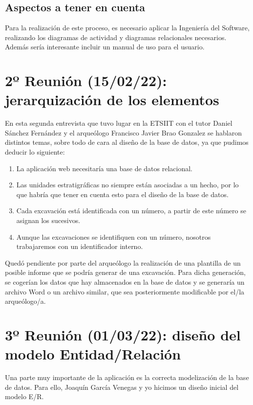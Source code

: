     \subsection{Aspectos a tener en cuenta}
    Para la realización de este proceso, es necesario aplicar la Ingeniería del Software,
    realizando los diagramas de actividad y diagramas relacionales necesarios.
    Además sería interesante incluir un manual de uso para el usuario.

\section{2º Reunión (15/02/22): jerarquización de los elementos}
En esta segunda entrevista que tuvo lugar en la ETSIIT con el tutor Daniel Sánchez Fernández
y el arqueólogo Francisco Javier Brao Gonzalez se hablaron distintos temas, sobre todo de cara
al diseño de la base de datos, ya que pudimos deducir lo siguiente:

    \begin{enumerate}
        \item La aplicación web necesitaría una base de datos relacional.
        \item Las unidades estratigráficas no siempre están asociadas a un hecho, por lo
        que habría que tener en cuenta esto para el diseño de la base de datos.
        \item Cada excavación está identificada con un número, a partir de este número
        se asignan los sucesivos.
        \item Aunque las excavaciones se identifiquen con un número, nosotros trabajaremos
        con un identificador interno.
    \end{enumerate}

Quedó pendiente por parte del arqueólogo la realización de una plantilla de un posible informe
que se podría generar de una excavación. Para dicha generación, se cogerían los datos
que hay almacenados en la base de datos y se generaría un archivo Word o un archivo similar,
que sea posteriormente modificable por el/la arqueólogo/a.


\section{3º Reunión (01/03/22): diseño del modelo Entidad/Relación}
Una parte muy importante de la aplicación es la correcta modelización de la base de datos.
Para ello, Joaquín García Venegas y yo hicimos un diseño inicial del modelo E/R.

